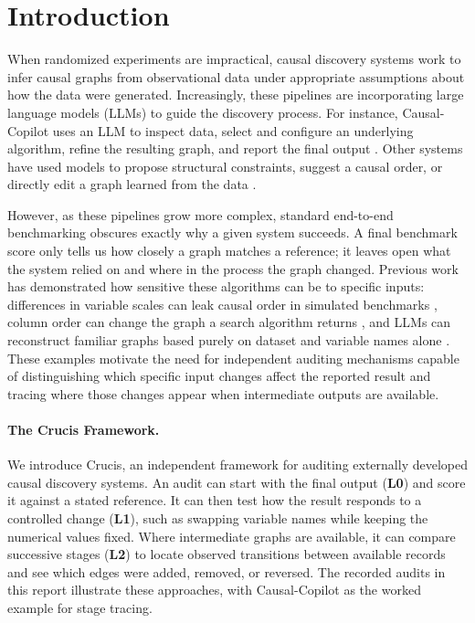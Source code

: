 \documentclass[12pt,letterpaper]{article}
\begin{document}
\section{Introduction}
\label{sec:intro}

When randomized experiments are impractical, causal discovery systems work to infer causal graphs from observational data under appropriate assumptions about how the data were generated. Increasingly, these pipelines are incorporating large language models (LLMs) to guide the discovery process. For instance, Causal-Copilot uses an LLM to inspect data, select and configure an underlying algorithm, refine the resulting graph, and report the final output \citep{wang2025causalcopilot}. Other systems have used models to propose structural constraints, suggest a causal order, or directly edit a graph learned from the data \citep{khatibi2024alcm,shen2024matmcd,vashishtha2025causal}.

However, as these pipelines grow more complex, standard end-to-end benchmarking obscures exactly why a given system succeeds. A final benchmark score only tells us how closely a graph matches a reference; it leaves open what the system relied on and where in the process the graph changed. Previous work has demonstrated how sensitive these algorithms can be to specific inputs: differences in variable scales can leak causal order in simulated benchmarks \citep{reisach2021beware}, column order can change the graph a search algorithm returns \citep{kitson2024impact}, and LLMs can reconstruct familiar graphs based purely on dataset and variable names alone \citep{srivastava2025llm}. These examples motivate the need for independent auditing mechanisms capable of distinguishing which specific input changes affect the reported result and tracing where those changes appear when intermediate outputs are available.

\paragraph{The Crucis Framework.} We introduce Crucis, an independent framework for auditing externally developed causal discovery systems. An audit can start with the final output (\textbf{L0}) and score it against a stated reference. It can then test how the result responds to a controlled change (\textbf{L1}), such as swapping variable names while keeping the numerical values fixed. Where intermediate graphs are available, it can compare successive stages (\textbf{L2}) to locate observed transitions between available records and see which edges were added, removed, or reversed. The recorded audits in this report illustrate these approaches, with Causal-Copilot as the worked example for stage tracing.
\end{document}

